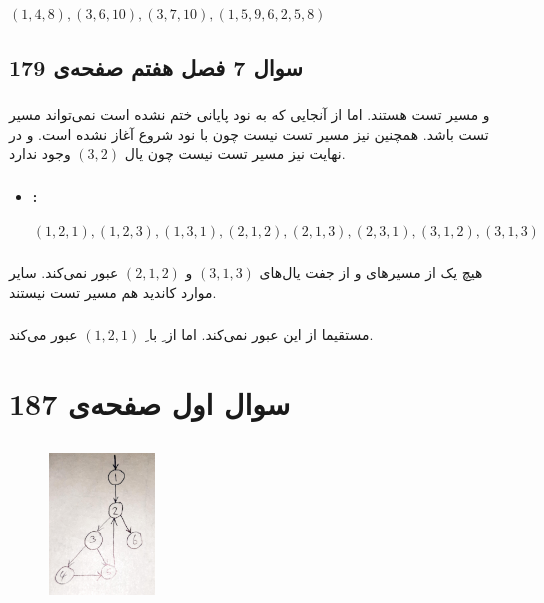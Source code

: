 \documentclass{article}
\begin{document}
\subsubsection{}
\begin{latin}
$
(1,4,8), (3,6,10), (3,7,10), (1,5,9,6,2,5,8)
$
\end{latin}


\subsection{سوال 7 فصل هفتم صفحه‌ی 179}
\subsubsection{}
 و  مسیر تست هستند. اما از آنجایی که  به نود پایانی ختم نشده است نمی‌تواند مسیر تست باشد. همچنین  نیز مسیر تست نیست چون با نود شروع آغاز نشده است. و در نهایت  نیز مسیر تست نیست چون یال $(3, 2)$ وجود ندارد.
\subsubsection{}
\begin{itemize}
\item \textbf{: }
\begin{latin}
$
(1, 2, 1), (1, 2, 3), (1, 3, 1), (2, 1, 2), (2, 1, 3), (2, 3, 1), (3, 1, 2), (3, 1, 3)
$
\end{latin}
\end{itemize}

\subsubsection{}
هیچ یک از مسیر‌های  و  از جفت یال‌های $(3, 1, 3)$ و $(2, 1, 2)$ عبور نمی‌کند. سایر موارد کاندید هم مسیر تست نیستند.
\subsubsection{}
 مستقیما از این  عبور نمی‌کند. اما  از ِ با ِ $(1, 2, 1)$ عبور می‌کند.

\section{سوال اول صفحه‌ی 187}
\subsection{}
\begin{figure}[H]
    \centering
    \includegraphics[width=0.25\textwidth]{figures/swt1.jpg}
    \caption
	{}
    \label{fig:fig1}
\end{figure}
\end{document}
